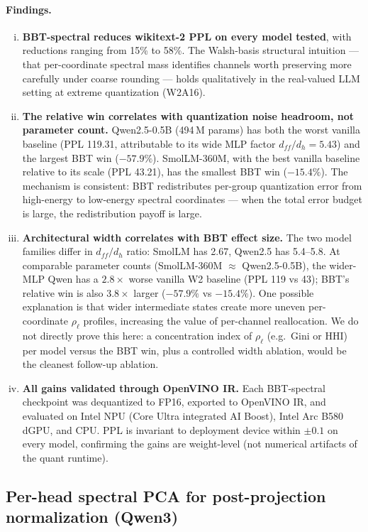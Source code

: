 \documentclass[11pt]{article}
\begin{document}
\paragraph{Findings.}
\begin{enumerate}[(i)]
    \item \textbf{BBT-spectral reduces wikitext-2 PPL on every model tested}, with reductions ranging from 15\% to 58\%. The Walsh-basis structural intuition --- that per-coordinate spectral mass identifies channels worth preserving more carefully under coarse rounding --- holds qualitatively in the real-valued LLM setting at extreme quantization (W2A16).
    \item \textbf{The relative win correlates with quantization noise headroom, not parameter count.} Qwen2.5-0.5B (494\,M params) has both the worst vanilla baseline (PPL 119.31, attributable to its wide MLP factor $d_{ff}/d_h = 5.43$) and the largest BBT win ($-57.9\%$). SmolLM-360M, with the best vanilla baseline relative to its scale (PPL 43.21), has the smallest BBT win ($-15.4\%$). The mechanism is consistent: BBT redistributes per-group quantization error from high-energy to low-energy spectral coordinates --- when the total error budget is large, the redistribution payoff is large.
    \item \textbf{Architectural width correlates with BBT effect size.} The two model families differ in $d_{ff}/d_h$ ratio: SmolLM has 2.67, Qwen2.5 has 5.4--5.8. At comparable parameter counts (SmolLM-360M $\approx$ Qwen2.5-0.5B), the wider-MLP Qwen has a $2.8\times$ worse vanilla W2 baseline (PPL 119 vs 43); BBT's relative win is also $3.8\times$ larger ($-57.9\%$ vs $-15.4\%$). One possible explanation is that wider intermediate states create more uneven per-coordinate $\rho_\ell$ profiles, increasing the value of per-channel reallocation. We do not directly prove this here: a concentration index of $\rho_\ell$ (e.g.\ Gini or HHI) per model versus the BBT win, plus a controlled width ablation, would be the cleanest follow-up ablation.
    \item \textbf{All gains validated through OpenVINO IR.} Each BBT-spectral checkpoint was dequantized to FP16, exported to OpenVINO IR, and evaluated on Intel NPU (Core Ultra integrated AI Boost), Intel Arc B580 dGPU, and CPU. PPL is invariant to deployment device within $\pm 0.1$ on every model, confirming the gains are weight-level (not numerical artifacts of the quant runtime).
\end{enumerate}

\subsection{Per-head spectral PCA for post-projection normalization (Qwen3)}
\end{document}
